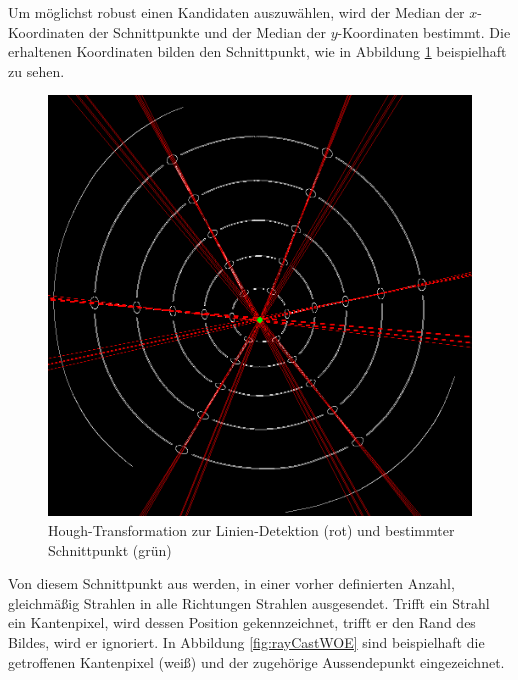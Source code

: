Um möglichst robust einen Kandidaten auszuwählen, wird der Median der $x$-Koordinaten der Schnittpunkte und der Median der $y$-Koordinaten bestimmt. Die erhaltenen Koordinaten bilden den Schnittpunkt, wie in Abbildung \ref{fig:houghLines} beispielhaft zu sehen.

\begin{figure}[!htb]
	\centering
	\includegraphics[scale=.25]{images/houghLines.png}
	\caption{Hough-Transformation zur Linien-Detektion (rot) und bestimmter Schnittpunkt (grün) }
	\label{fig:houghLines}
\end{figure}

Von diesem Schnittpunkt aus werden, in einer vorher definierten Anzahl, gleichmäßig Strahlen in alle Richtungen Strahlen ausgesendet.
Trifft ein Strahl ein Kantenpixel, wird dessen Position gekennzeichnet, trifft er den Rand des Bildes, wird er ignoriert. In Abbildung \ref{fig:rayCastWOE} sind beispielhaft die getroffenen Kantenpixel (weiß) und der zugehörige Aussendepunkt eingezeichnet.

